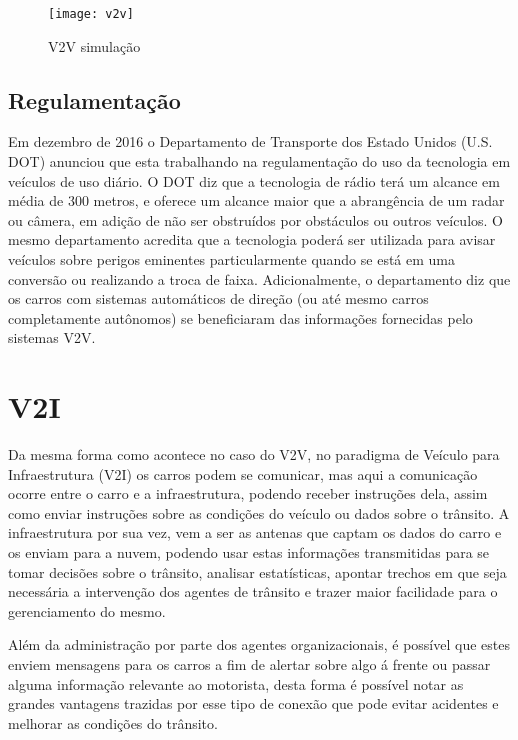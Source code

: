\begin{figure}[!h]
\caption{\label{fig:simulacao} V2V simulação}
\begin{center}
\texttt{[image: v2v]}
\end{center}
\end{figure}

\subsection{Regulamentação}
\label{subsec:regulamentacao}
Em dezembro de 2016 o Departamento de Transporte dos Estado Unidos (U.S. DOT) anunciou que esta trabalhando na regulamentação do uso da tecnologia em veículos de uso diário. O DOT diz que a tecnologia de rádio terá um alcance em média de 300 metros, e oferece um alcance maior que a abrangência de um radar ou câmera, em adição de não ser obstruídos por obstáculos ou outros veículos. O mesmo departamento acredita que a tecnologia poderá ser utilizada para avisar veículos sobre perigos eminentes particularmente quando se está em uma conversão ou realizando a troca de faixa. Adicionalmente, o departamento diz que os carros com sistemas automáticos de direção (ou até mesmo carros completamente autônomos) se beneficiaram das informações fornecidas pelo sistemas V2V.~\cite{usdot}

\section{V2I}
\label{sec:v2i}
Da mesma forma como acontece no caso do V2V, no paradigma de Veículo para Infraestrutura (V2I) os carros podem se comunicar, mas aqui a comunicação ocorre entre o carro e a infraestrutura, podendo receber instruções dela, assim como enviar instruções sobre as condições do veículo ou dados sobre o trânsito. A infraestrutura por sua vez, vem a ser as antenas que captam os dados do carro e os enviam para a nuvem, podendo usar estas informações transmitidas para se tomar decisões sobre o trânsito, analisar estatísticas, apontar trechos em que seja necessária a intervenção dos agentes de trânsito e trazer maior facilidade para o gerenciamento do mesmo.~\cite{howard2014}

Além da administração por parte dos agentes organizacionais, é possível que estes enviem mensagens para os carros a fim de alertar sobre algo á frente ou passar alguma informação relevante ao motorista, desta forma é possível notar as grandes vantagens trazidas por esse tipo de conexão que pode evitar acidentes e melhorar as condições do trânsito.~\cite{howard2014}

